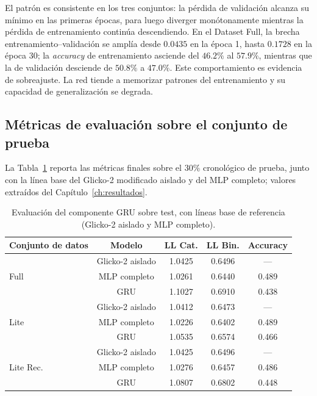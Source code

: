 El patr\'on es consistente en los tres conjuntos: la p\'erdida de validaci\'on alcanza su m\'inimo en las primeras \'epocas, para luego diverger mon\'otonamente mientras la p\'erdida de entrenamiento contin\'ua descendiendo. En el Dataset Full, la brecha entrenamiento--validaci\'on se ampl\'ia desde $0.0435$ en la \'epoca 1, hasta $0.1728$ en la \'epoca 30; la \textit{accuracy} de entrenamiento asciende del $46.2\%$ al $57.9\%$, mientras que la de validaci\'on desciende de $50.8\%$ a $47.0\%$. Este comportamiento es evidencia de sobreajuste. La red tiende a memorizar patrones del entrenamiento y su capacidad de generalizaci\'on se degrada.

\subsection{M\'etricas de evaluaci\'on sobre el conjunto de prueba}
\label{subsec:app_gru_test}

La Tabla~\ref{tab:gru_test} reporta las m\'etricas finales sobre el $30\%$ cronol\'ogico de prueba, junto con la l\'inea base del Glicko-2 modificado aislado y del MLP completo; valores extra\'idos del Cap\'itulo~\ref{ch:resultados}.

\begin{table}[htbp]
	\centering
	\caption{Evaluaci\'on del componente GRU sobre test, con l\'ineas base de referencia (Glicko-2 aislado y MLP completo).}
	\label{tab:gru_test}
	\begin{tabular}{lcccc}
		\toprule
		\textbf{Conjunto de datos} & \textbf{Modelo} & \textbf{LL Cat.} & \textbf{LL Bin.} & \textbf{Accuracy} \\
		\midrule
		\multirow{3}{*}{Full} & Glicko-2 aislado & 1.0425 & 0.6496 & --- \\
		& MLP completo & 1.0261 & 0.6440 & 0.489 \\
		& GRU & 1.1027 & 0.6910 & 0.438 \\
		\midrule
		\multirow{3}{*}{Lite} & Glicko-2 aislado & 1.0412 & 0.6473 & --- \\
		& MLP completo & 1.0226 & 0.6402 & 0.489 \\
		& GRU & 1.0535 & 0.6574 & 0.466 \\
		\midrule
		\multirow{3}{*}{Lite Rec.} & Glicko-2 aislado & 1.0425 & 0.6496 & --- \\
		& MLP completo & 1.0276 & 0.6457 & 0.486 \\
		& GRU & 1.0807 & 0.6802 & 0.448 \\
		\bottomrule
	\end{tabular}
\end{table}

